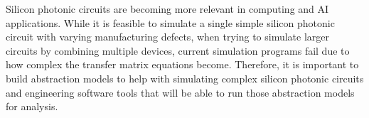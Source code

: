 \begin{center}{}\end{center}

Silicon photonic circuits are becoming more relevant in computing and AI applications. While it is feasible to simulate
  a single simple silicon photonic circuit with varying manufacturing defects, when trying to
  simulate larger circuits by combining multiple devices, current simulation programs 
  fail due to how complex the transfer matrix equations become. Therefore,
  it is important to build abstraction models to help with simulating complex silicon 
  photonic circuits and engineering software tools that will be able to run those abstraction models for analysis.